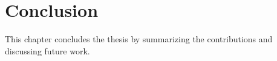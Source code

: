 \chapter{Conclusion}
\label{ch:conclusion}

This chapter concludes the thesis by summarizing the contributions and discussing future work.


